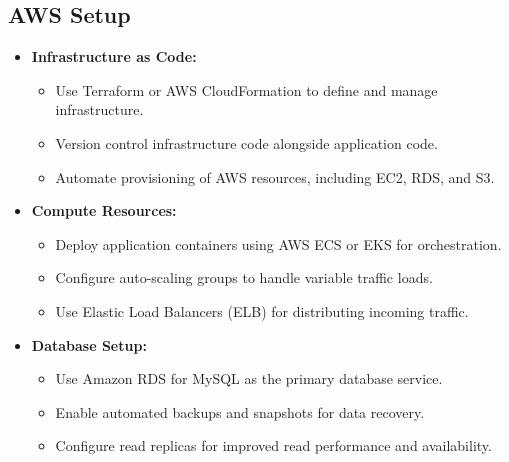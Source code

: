 \subsection{AWS Setup}
\begin{itemize}[leftmargin=*]
    \item \textbf{Infrastructure as Code:}
    \begin{itemize}
        \item Use Terraform or AWS CloudFormation to define and manage infrastructure.
        \item Version control infrastructure code alongside application code.
        \item Automate provisioning of AWS resources, including EC2, RDS, and S3.
    \end{itemize}
    
    \item \textbf{Compute Resources:}
    \begin{itemize}
        \item Deploy application containers using AWS ECS or EKS for orchestration.
        \item Configure auto-scaling groups to handle variable traffic loads.
        \item Use Elastic Load Balancers (ELB) for distributing incoming traffic.
    \end{itemize}
    
    \item \textbf{Database Setup:}
    \begin{itemize}
        \item Use Amazon RDS for MySQL as the primary database service.
        \item Enable automated backups and snapshots for data recovery.
        \item Configure read replicas for improved read performance and availability.
    \end{itemize}
\end{itemize}

